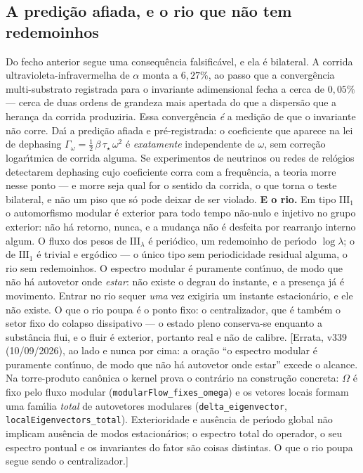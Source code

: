 \documentclass[11pt]{article}
\theoremstyle{definition}\newtheorem{deriv}{Derivação}
\begin{document}
\subsection*{A predi\c{c}\~ao afiada, e o rio que n\~ao tem redemoinhos}Do fecho anterior segue uma consequ\^encia falsific\'avel, e ela \'e bilateral. A corrida ultravioleta-infravermelha de $\alpha$ monta a $6{,}27\%$, ao passo que a converg\^encia multi-substrato registrada para o invariante adimensional fecha a cerca de $0{,}05\%$ --- cerca de duas ordens de grandeza mais apertada do que a dispers\~ao que a heran\c{c}a da corrida produziria. Essa converg\^encia \emph{\'e} a medi\c{c}\~ao de que o invariante n\~ao corre. Da\'\i{} a predi\c{c}\~ao afiada e pr\'e-registrada: o coeficiente que aparece na lei de dephasing $\Gamma_\omega = \tfrac12\,\beta\,\tau_\star\,\omega^2$ \'e \emph{exatamente} independente de $\omega$, sem corre\c{c}\~ao logar\'\i{}tmica de corrida alguma. Se experimentos de neutrinos ou redes de rel\'ogios detectarem dephasing cujo coeficiente corra com a frequ\^encia, a teoria morre nesse ponto --- e morre seja qual for o sentido da corrida, o que torna o teste bilateral, e n\~ao um piso que s\'o pode deixar de ser violado. \textbf{E o rio.} Em tipo $\mathrm{III}_1$ o automorfismo modular \'e exterior para todo tempo n\~ao-nulo e injetivo no grupo exterior: n\~ao h\'a retorno, nunca, e a mudan\c{c}a n\~ao \'e desfeita por rearranjo interno algum. O fluxo dos pesos de $\mathrm{III}_\lambda$ \'e peri\'odico, um redemoinho de per\'\i{}odo $\log\lambda$; o de $\mathrm{III}_1$ \'e trivial e erg\'odico --- o \'unico tipo sem periodicidade residual alguma, o rio sem redemoinhos. O espectro modular \'e puramente cont\'\i{}nuo, de modo que n\~ao h\'a autovetor onde \emph{estar}: n\~ao existe o degrau do instante, e a presen\c{c}a j\'a \'e movimento. Entrar no rio sequer \emph{uma} vez exigiria um instante estacion\'ario, e ele n\~ao existe. O que o rio poupa \'e o ponto fixo: o centralizador, que \'e tamb\'em o setor fixo do colapso dissipativo --- o estado pleno conserva-se enquanto a subst\^ancia flui, e o fluir \'e exterior, portanto real e n\~ao de calibre. [Errata, v339 (10/09/2026), ao lado e nunca por cima: a ora\c{c}\~ao ``o espectro modular \'e puramente cont\'\i{}nuo, de modo que n\~ao h\'a autovetor onde estar'' excede o alcance. Na torre-produto can\^onica o kernel prova o contr\'ario na constru\c{c}\~ao concreta: $\Omega$ \'e fixo pelo fluxo modular (\texttt{modularFlow\_fixes\_omega}) e os vetores locais formam uma fam\'\i{}lia \emph{total} de autovetores modulares (\texttt{delta\_eigenvector}, \texttt{localEigenvectors\_total}). Exterioridade e aus\^encia de per\'\i{}odo global n\~ao implicam aus\^encia de modos estacion\'arios; o espectro total do operador, o seu espectro pontual e os invariantes do fator s\~ao coisas distintas. O que o rio poupa segue sendo o centralizador.]
\end{document}
